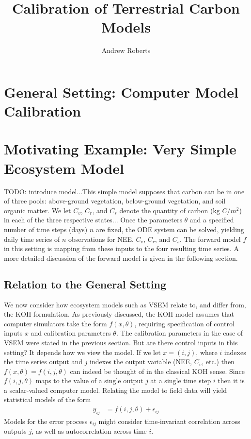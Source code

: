\documentclass[12pt]{article}
\title{Calibration of Terrestrial Carbon Models}
\author{Andrew Roberts}
\begin{document}
\maketitle
\tableofcontents
\newpage

\section{General Setting: Computer Model Calibration}
\section{Motivating Example: Very Simple Ecosystem Model}
TODO: introduce model...This simple model supposes that carbon can be in one of three pools: above-ground vegetation, below-ground vegetation, and 
soil organic matter. We let $C_v$, $C_r$, and $C_s$ denote the quantity of carbon (kg $C/m^2$) in each of the three respective states... 
Once the parameters $\theta$ and a specified number of time steps (days) $n$ are fixed, the ODE system can be solved, yielding daily time series of $n$
observations for NEE, $C_v$, $C_r$, and $C_s$. The forward model $f$ in this setting is mapping from these inputs to the four resulting time series. A more 
detailed discussion of the forward model is given in the following section. 

\subsection{Relation to the General Setting}
We now consider how ecosystem models such as VSEM relate to, and differ from, the KOH formulation. As previously discussed, the KOH model assumes that
computer simulators take the form $f(x, \theta)$, requiring specification of control inputs $x$ and calibration parameters $\theta$. The calibration parameters 
in the case of VSEM were stated in the previous section. But are there control inputs in this setting? It depends how we view the model. If we let 
$x = (i, j)$, where $i$ indexes the time series output and $j$ indexes the output variable (NEE, $C_v$, etc.) then $f(x, \theta) = f(i, j, \theta)$ can indeed be thought of in the 
classical KOH sense. Since $f(i, j, \theta)$ maps to the value of a single output $j$ at a single time step $i$ then it is a scalar-valued computer model. Relating the 
model to field data will yield statistical models of the form 
\begin{align}
y_{ij} &= f(i, j, \theta) + \epsilon_{ij} \label{ij_model}
\end{align}
Models for the error process $\epsilon_{ij}$ might consider time-invariant correlation across outputs $j$, as well as autocorrelation across time $i$. 
\end{document}
